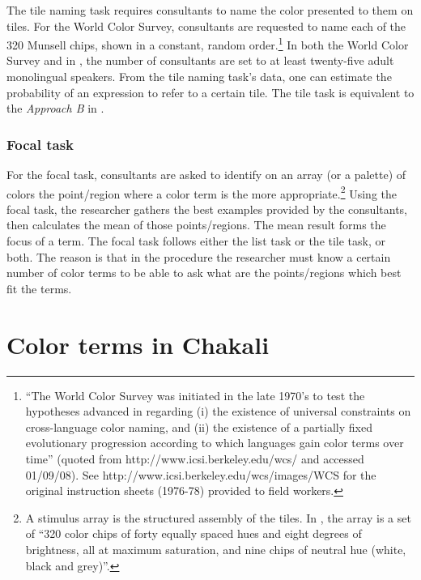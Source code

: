 The tile naming task requires  consultants to name the color presented to
them
on tiles. For the  World Color Survey, consultants are requested  to name
each
of the 320 Munsell chips, shown in a constant, random order.\footnote{``The
World Color Survey was initiated in the late 1970's to test the hypotheses
advanced in \cite{Berl69} regarding (i) the existence of universal constraints
on cross-language color naming, and (ii) the existence of a partially fixed
evolutionary progression according to which languages gain color terms over
time'' (quoted from http://www.icsi.berkeley.edu/wcs/ and accessed 01/09/08).
See http://www.icsi.berkeley.edu/wcs/images/WCS for  the original instruction
sheets (1976-78) provided to field workers.} In both the World Color Survey and
in \cite{Davi95}, the number
of consultants are set to at least twenty-five adult monolingual speakers.
From the
 tile naming task's  data, one can estimate the probability of an expression to
refer to a certain tile.  The tile task is equivalent to the \textit{Approach B}
in \citet[340]{Lenn67}. 



\subsubsection{Focal task}
\label{sec:focaltask}


For the  focal task,  consultants are asked to identify on an array (or a
palette)  of colors 
the point/region where a color term is the more appropriate.\footnote{A stimulus
array is the structured assembly of the tiles. In  \citet[5]{Berl69}, the
array is a set of ``320
color chips of forty equally spaced hues and eight degrees of brightness, all at
maximum saturation, and nine chips of neutral hue (white, black and grey)''.}
Using the focal task, the researcher gathers the best examples provided by the
consultants, then calculates the mean of those points/regions. The mean result
forms
the focus of a term.   The focal task  follows either the list task or the tile
task, or both. The reason is that in the procedure the researcher must know a
certain number of color terms to be able to ask what are the points/regions which 
  best fit the terms.


\section{Color terms in Chakali}
\label{sec:chabascolor}

